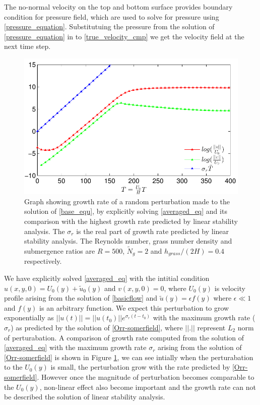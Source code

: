 \documentclass[12pt]{report}   %
\newcommand{\Ndg}{\tilde{N}_g}
\begin{document}
The no-normal velocity on the top and bottom surface provides boundary condition for pressure field, which are used to solve for pressure using \eqref{pressure_equation}. Substitutuing the pressure from the solution of \eqref{pressure_equation} in to \eqref{true_velocity_cmp} we get the velocity field at the next time step. 
\begin{figure}
\centerline{\includegraphics{LinearStabilityVsCFD1} }
\caption{Graph showing growth rate of a random perturbation made to the solution of \eqref{base_equ}, by explicitly solving \eqref{averaged_eq} and its comparison with the highest growth rate predicted by linear stability analysis. The $\sigma_r$ is the real part of growth rate predicted by linear stability analysis. The  Reynolds number, grass number density and submergence ratios are $R=500$, $\Ndg=2$ and $h_{grass}/(2H) = 0.4$ respectively.}
\label{CFD_vs_LinearStabilityGrowthRate}
\end{figure}

We have explicitly solved \eqref{averaged_eq} with the intitial condition $u(x,y,0) = U_{0}(y)+\tilde{u}_0(y)$ and $v(x,y,0)=0$, where $U_{0}(y)$ is velocity profile arising from the solution of \eqref{basicflow} and $\tilde{u}(y) = \epsilon f(y)$ where $\epsilon \ll 1$ and $f(y)$ is an arbitrary function. We expect this perturbation to grow exponentially as $||u(t)|| = ||u(t_0)|| e^{\sigma_r (t-t_0)}$ with the maximum growth rate ($\sigma_r$) as predicted by the solution of \eqref{Orr-somerfield}, where $||.||$ represent $L_2$ norm of perturabation. A comparison of growth rate computed from the solution of \eqref{averaged_eq} with the
maximum growth rate $\sigma_r$ arising from the solution of \eqref{Orr-somerfield} is shown in Figure \ref{CFD_vs_LinearStabilityGrowthRate}, we can see intially when the perturabation to the $U_0(y)$ is small, the perturbation grow with the rate predicted by \eqref{Orr-somerfield}. However once the magnitude of perturbation becomes comparable to the $U_0(y)$, non-linear effect also become important and the growth rate can not be described the solution of linear stability analysis. 
\end{document}
